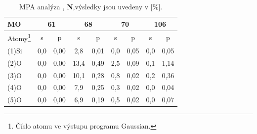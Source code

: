 \documentclass[
  digital, %
  table,   %
  lof,     %
  lot,     %
  oneside,
]{fithesis3}
\begin{document}
\begin{table}[htbp]\begin{minipage}{\textwidth}
\caption{MPA analýza , \textbf{N},výsledky jsou uvedeny v [\%].}
\begin{center}
\begin{tabular}{|l|c|c|c|c|c|c|c|c|}
\hline
 \label{si_model_orezany_MPA} MO &  \multicolumn{2}{c|}{61} &   \multicolumn{2}{c|}{68} &  \multicolumn{2}{c|}{70} &  \multicolumn{2}{c|}{106} \\ \hline
Atomy\footnote{Číslo atomu ve výstupu programu Gaussian.}  & s & p & s & p & s & p & s & p \\ \hline
(1)Si  & 0,0  & 0,00   & 2,8  & 0,01   & 0,0  & 0,05   & 0,0  & 0,05   \\ \hline
(2)O & 0,0  & 0,00   & 13,4  & 0,49   & 2,5  & 0,09   & 0,1  & 1,14   \\ \hline
(3)O & 0,0  & 0,00   & 10,1  & 0,28   & 0,8  & 0,02   & 0,2  & 0,36   \\ \hline
(4)O & 0,0  & 0,00   & 7,9  & 0,25   & 0,3  & 0,02   & 0,0  & 0,04   \\ \hline
(5)O & 0,0  & 0,00   & 6,9  & 0,19   & 0,5  & 0,02   & 0,0  & 0,07   \\ \hline
\end{tabular}
\end{center}\end{minipage}

\end{table}
\end{document}
